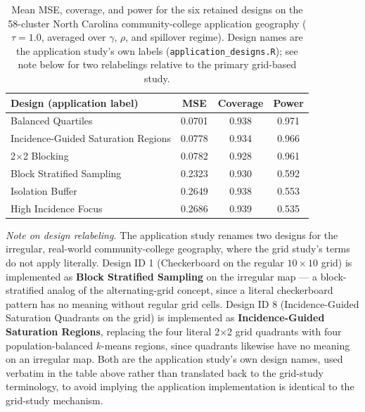 \documentclass[11pt]{article}
\begin{document}
\begin{table}[h]
\centering
\caption{Mean MSE, coverage, and power for the six retained designs on the
58-cluster North Carolina community-college application geography ($\tau=1.0$,
averaged over $\gamma$, $\rho$, and spillover regime). Design names are the
application study's own labels (\texttt{application\_designs.R}); see note
below for two relabelings relative to the primary grid-based study.}
\begin{tabular}{lccc}
\toprule
Design (application label) & MSE & Coverage & Power \\
\midrule
Balanced Quartiles                    & 0.0701 & 0.938 & 0.971 \\
Incidence-Guided Saturation Regions   & 0.0778 & 0.934 & 0.966 \\
2$\times$2 Blocking                   & 0.0782 & 0.928 & 0.961 \\
Block Stratified Sampling             & 0.2323 & 0.930 & 0.592 \\
Isolation Buffer                      & 0.2649 & 0.938 & 0.553 \\
High Incidence Focus                  & 0.2686 & 0.939 & 0.535 \\
\bottomrule
\end{tabular}
\end{table}

\textit{Note on design relabeling.} The application study renames two designs
for the irregular, real-world community-college geography, where the grid
study's terms do not apply literally. Design ID 1 (Checkerboard on the regular
$10\times10$ grid) is implemented as \textbf{Block Stratified Sampling} on the
irregular map --- a block-stratified analog of the alternating-grid concept,
since a literal checkerboard pattern has no meaning without regular grid cells.
Design ID 8 (Incidence-Guided Saturation Quadrants on the grid) is implemented
as \textbf{Incidence-Guided Saturation Regions}, replacing the four literal
2$\times$2 grid quadrants with four population-balanced $k$-means regions,
since quadrants likewise have no meaning on an irregular map. Both are the
application study's own design names, used verbatim in the table above rather
than translated back to the grid-study terminology, to avoid implying the
application implementation is identical to the grid-study mechanism.
\end{document}
